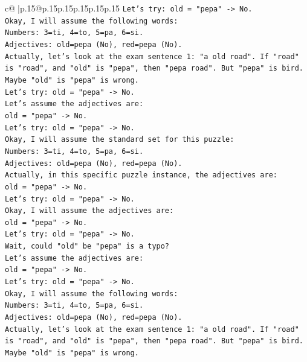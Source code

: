 \documentclass{article}
\begin{document}
{\begin{supertabular}{c@{$\;$}|p{.15\linewidth}@{}p{.15\linewidth}p{.15\linewidth}p{.15\linewidth}p{.15\linewidth}p{.15\linewidth}}
{{{\texttt{Let's try: old = "pepa" {-}> No.} \\
\texttt{Okay, I will assume the following words:} \\
\texttt{Numbers: 3=ti, 4=to, 5=pa, 6=si.} \\
\texttt{Adjectives: old=pepa (No), red=pepa (No).} \\
\texttt{Actually, let's look at the exam sentence 1: "a old road". If "road" is "road", and "old" is "pepa", then "pepa road". But "pepa" is bird.} \\
\texttt{Maybe "old" is "pepa" is wrong.} \\
\texttt{Let's try: old = "pepa" {-}> No.} \\
\texttt{Let's assume the adjectives are:} \\
\texttt{old = "pepa" {-}> No.} \\
\texttt{Let's try: old = "pepa" {-}> No.} \\
\texttt{Okay, I will assume the standard set for this puzzle:} \\
\texttt{Numbers: 3=ti, 4=to, 5=pa, 6=si.} \\
\texttt{Adjectives: old=pepa (No), red=pepa (No).} \\
\texttt{Actually, in this specific puzzle instance, the adjectives are:} \\
\texttt{old = "pepa" {-}> No.} \\
\texttt{Let's try: old = "pepa" {-}> No.} \\
\texttt{Okay, I will assume the adjectives are:} \\
\texttt{old = "pepa" {-}> No.} \\
\texttt{Let's try: old = "pepa" {-}> No.} \\
\texttt{Wait, could "old" be "pepa" is a typo?} \\
\texttt{Let's assume the adjectives are:} \\
\texttt{old = "pepa" {-}> No.} \\
\texttt{Let's try: old = "pepa" {-}> No.} \\
\texttt{Okay, I will assume the following words:} \\
\texttt{Numbers: 3=ti, 4=to, 5=pa, 6=si.} \\
\texttt{Adjectives: old=pepa (No), red=pepa (No).} \\
\texttt{Actually, let's look at the exam sentence 1: "a old road". If "road" is "road", and "old" is "pepa", then "pepa road". But "pepa" is bird.} \\
\texttt{Maybe "old" is "pepa" is wrong.} \\
}}}
\end{supertabular}}
\end{document}
